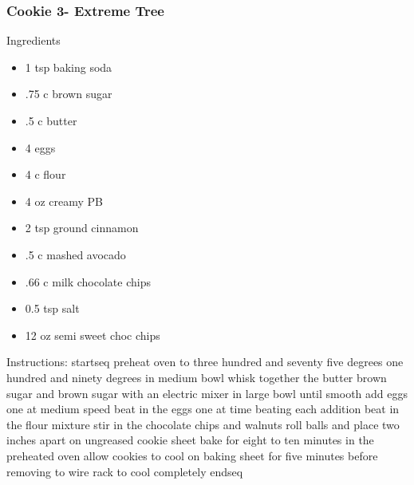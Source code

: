\documentclass[11pt, a4paper]{article}
\begin{document}
   \subsubsection*{Cookie 3- Extreme Tree}
   Ingredients
   \begin{multicols}{2}
		\begin{itemize}
		\item1 tsp baking soda
		\item.75 c brown sugar
		\item.5 c butter
		\item4 eggs
		\item4 c flour
		\item4 oz creamy PB
		\item2 tsp ground cinnamon
		\item.5 c mashed avocado
		\item.66 c milk chocolate chips
		\item0.5 tsp salt
		\item12 oz semi sweet choc chips
	\end{itemize}
	\end{multicols}
Instructions: startseq preheat oven to three hundred and seventy five degrees one hundred and ninety degrees in medium bowl whisk together the butter brown sugar and brown sugar with an electric mixer in large bowl until smooth add eggs one at medium speed beat in the eggs one at time beating each addition beat in the flour mixture stir in the chocolate chips and walnuts roll balls and place two inches apart on ungreased cookie sheet bake for eight to ten minutes in the preheated oven allow cookies to cool on baking sheet for five minutes before removing to wire rack to cool completely endseq
\end{document}
